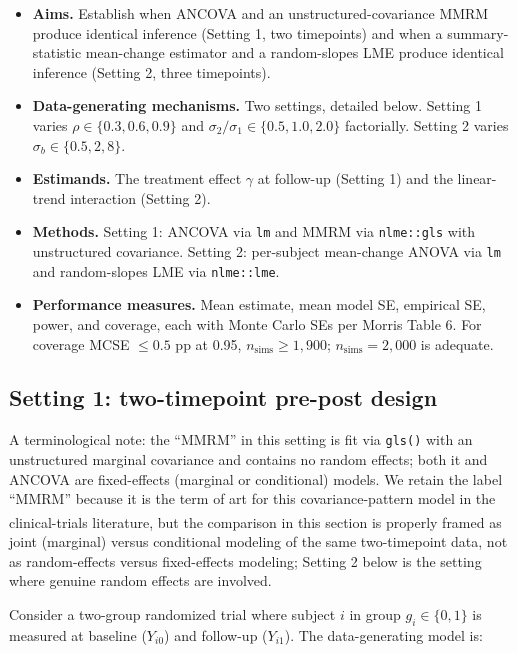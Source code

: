 \documentclass[
  11pt,
]{article}
\providecommand{\tightlist}{%
  \setlength{\itemsep}{0pt}\setlength{\parskip}{0pt}}
\begin{document}
\begin{itemize}
\tightlist
\item
  \textbf{Aims.} Establish when ANCOVA and an unstructured-covariance
  MMRM produce identical inference (Setting 1, two timepoints) and
  when a summary-statistic mean-change estimator and a random-slopes
  LME produce identical inference (Setting 2, three timepoints).
\item
  \textbf{Data-generating mechanisms.} Two settings, detailed below.
  Setting 1 varies \(\rho \in \{0.3, 0.6, 0.9\}\) and
  \(\sigma_2 / \sigma_1 \in \{0.5, 1.0, 2.0\}\) factorially. Setting
  2 varies \(\sigma_b \in \{0.5, 2, 8\}\).
\item
  \textbf{Estimands.} The treatment effect \(\gamma\) at follow-up
  (Setting 1) and the linear-trend interaction (Setting 2).
\item
  \textbf{Methods.} Setting 1: ANCOVA via \texttt{lm} and MMRM via \texttt{nlme::gls}
  with unstructured covariance. Setting 2: per-subject mean-change
  ANOVA via \texttt{lm} and random-slopes LME via \texttt{nlme::lme}.
\item
  \textbf{Performance measures.} Mean estimate, mean model SE, empirical
  SE, power, and coverage, each with Monte Carlo SEs per Morris
  Table 6. For coverage MCSE \(\leq 0.5\) pp at 0.95,
  \(n_{\mathrm{sims}} \geq 1{,}900\); \(n_{\mathrm{sims}} = 2{,}000\)
  is adequate.
\end{itemize}

\subsection{Setting 1: two-timepoint pre-post design}\label{setting-1-two-timepoint-pre-post-design}

A terminological note: the ``MMRM'' in this setting is fit
via \texttt{gls()} with an unstructured marginal covariance and
contains no random effects; both it and ANCOVA are
fixed-effects (marginal or conditional) models. We retain
the label ``MMRM'' because it is the term of art for this
covariance-pattern model in the clinical-trials literature\textsuperscript{}, but the comparison in this
section is properly framed as joint (marginal) versus
conditional modeling of the same two-timepoint data, not
as random-effects versus fixed-effects modeling; Setting 2
below is the setting where genuine random effects are
involved.

Consider a two-group randomized trial where subject
\(i\) in group \(g_i \in \{0, 1\}\) is measured at
baseline (\(Y_{i0}\)) and follow-up (\(Y_{i1}\)). The
data-generating model is:
\end{document}
